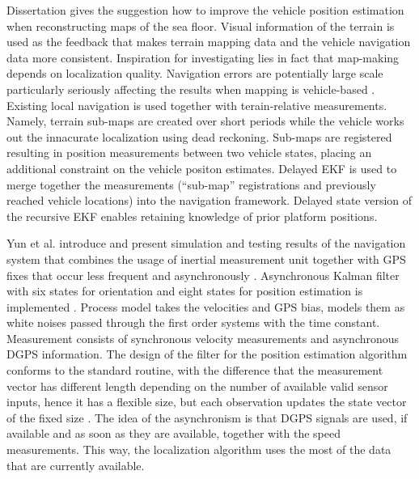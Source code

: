 Dissertation \cite{roman05} gives the suggestion how to improve the vehicle position estimation when reconstructing maps of the sea floor. Visual information of the terrain is used as the feedback that makes terrain mapping data and the vehicle navigation data more consistent. Inspiration for investigating lies in fact that map-making depends on localization quality. Navigation errors are potentially large scale particularly seriously affecting the results when mapping is vehicle-based \cite{roman05}. Existing local navigation is used together with terain-relative measurements. Namely, terrain sub-maps are created over short periods while the vehicle works out the innacurate localization using dead reckoning. Sub-maps are registered resulting in position measurements between two vehicle states, placing an additional constraint on the vehicle positon estimates. Delayed EKF is used to merge together the measurements (``sub-map'' registrations and previously reached vehicle locations) into the navigation framework. Delayed state version of the recursive EKF enables retaining knowledge of prior platform positions.  


Yun et al. introduce and present simulation and testing results of the navigation system that combines the usage of inertial measurement unit together with GPS fixes that occur less frequent and asynchronously \cite{yun00}. Asynchronous Kalman filter with six states for orientation and eight states for position estimation is implemented \cite{yun00}. Process model takes the velocities and GPS bias, models them as white noises passed through the first order systems with the time constant. Measurement consists of synchronous velocity measurements and asynchronous DGPS information. The design of the filter for the position estimation algorithm conforms to the standard routine, with the difference that the measurement vector has different length depending on the number of available valid sensor inputs, hence it has a flexible size, but each observation updates the state vector of the fixed size \cite{yun00}. The idea of the asynchronism is that DGPS signals are used, if available and as soon as they are available, together with the speed measurements. This way, the localization algorithm uses the most of the data that are currently available.  

